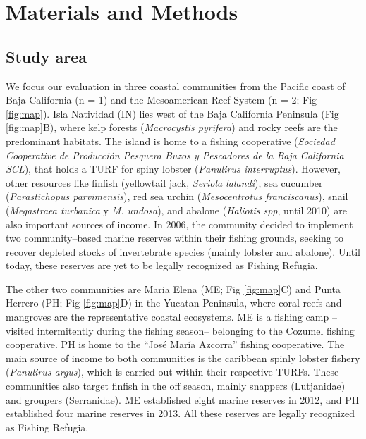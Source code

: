 \documentclass{frontiersSCNS}
\theoremstyle{definition}
\theoremstyle{definition}
\theoremstyle{definition}
\theoremstyle{remark}
\begin{document}
\section{Materials and Methods}\label{materials-and-methods}

\subsection{Study area}\label{study-area}

We focus our evaluation in three coastal communities from the Pacific
coast of Baja California (n = 1) and the Mesoamerican Reef System (n =
2; Fig \ref{fig:map}). Isla Natividad (IN) lies west of the Baja
California Peninsula (Fig \ref{fig:map}B), where kelp forests
(\emph{Macrocystis pyrifera}) and rocky reefs are the predominant
habitats. The island is home to a fishing cooperative (\emph{Sociedad
Cooperative de Producción Pesquera Buzos y Pescadores de la Baja
California SCL}), that holds a TURF for spiny lobster (\emph{Panulirus
interruptus}). However, other resources like finfish (yellowtail jack,
\emph{Seriola lalandi}), sea cucumber (\emph{Parastichopus
parvimensis}), red sea urchin (\emph{Mesocentrotus franciscanus}), snail
(\emph{Megastraea turbanica} y \emph{M. undosa}), and abalone
(\emph{Haliotis spp}, until 2010) are also important sources of income.
In 2006, the community decided to implement two community--based marine
reserves within their fishing grounds, seeking to recover depleted
stocks of invertebrate species (mainly lobster and abalone). Until
today, these reserves are yet to be legally recognized as Fishing
Refugia.

The other two communities are Maria Elena (ME; Fig \ref{fig:map}C) and
Punta Herrero (PH; Fig \ref{fig:map}D) in the Yucatan Peninsula, where
coral reefs and mangroves are the representative coastal ecosystems. ME
is a fishing camp --visited intermitently during the fishing season--
belonging to the Cozumel fishing cooperative. PH is home to the ``José
María Azcorra'' fishing cooperative. The main source of income to both
communities is the caribbean spinly lobster fishery (\emph{Panulirus
argus}), which is carried out within their respective TURFs. These
communities also target finfish in the off season, mainly snappers
(Lutjanidae) and groupers (Serranidae). ME established eight marine
reserves in 2012, and PH established four marine reserves in 2013. All
these reserves are legally recognized as Fishing Refugia.
\end{document}
